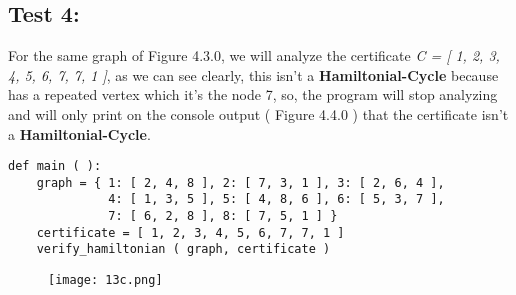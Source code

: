 \subsection{Test 4:}

For the same graph of Figure 4.3.0, we will analyze the certificate {\itshape C = [ 1, 2, 3, 4, 5, 6, 7, 7, 1 ]}, as we can see clearly, this isn't a {\bfseries Hamiltonial-Cycle} because has a repeated vertex which it's the node 7, so, the program will stop analyzing and will only print on the console output ( Figure 4.4.0 ) that the certificate isn't a {\bfseries Hamiltonial-Cycle}. \hfill \break

\begin{lstlisting}
def main ( ):
    graph = { 1: [ 2, 4, 8 ], 2: [ 7, 3, 1 ], 3: [ 2, 6, 4 ],
              4: [ 1, 3, 5 ], 5: [ 4, 8, 6 ], 6: [ 5, 3, 7 ],
              7: [ 6, 2, 8 ], 8: [ 7, 5, 1 ] }
    certificate = [ 1, 2, 3, 4, 5, 6, 7, 7, 1 ]
    verify_hamiltonian ( graph, certificate )
\end{lstlisting} \hfill \break

\begin{figure}[H]
\texttt{[image: 13c.png]}
\centering \linebreak {}
\end{figure}

\pagebreak